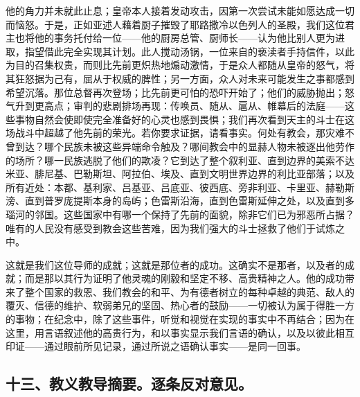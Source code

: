 他的角力并未就此止息；皇帝本人接着发动攻击，因第一次尝试未能如愿达成一切而恼怒。于是，正如亚述人藉着厨子摧毁了耶路撒冷以色列人的圣殿，我们这位君主也将他的事务托付给一位——他的厨房总管、厨师长——认为他比别人更为进取，指望借此完全实现其计划。此人搅动汤锅，一位来自的亵渎者手持信件，以此为目的召集权贵，而则比先前更炽热地煽动激情，于是众人都随从皇帝的怒气，将其狂怒据为己有，屈从于权威的脾性；另一方面，众人对未来可能发生之事都感到希望沉落。那位总督再次登场；比先前更可怕的恐吓开始了；他们的威胁抛出；怒气升到更高点；审判的悲剧排场再现：传唤员、随从、扈从、帷幕后的法庭——这些事物自然会使即使完全准备好的心灵也感到畏惧；我们再次看到天主的斗士在这场战斗中超越了他先前的荣光。若你要求证据，请看事实。何处有教会，那灾难不曾到达？哪个民族未被这些异端命令触及？哪间教会中的显赫人物未被逐出他劳作的场所？哪一民族逃脱了他们的欺凌？它到达了整个叙利亚、直到边界的美索不达米亚、腓尼基、巴勒斯坦、阿拉伯、埃及、直到文明世界边界的利比亚部落；以及所有近处：本都、基利家、吕基亚、吕底亚、彼西底、旁非利亚、卡里亚、赫勒斯滂、直到普罗庞提斯本身的岛屿；色雷斯沿海，直到色雷斯延伸之处，以及直到多瑙河的邻国。这些国家中有哪一个保持了先前的面貌，除非它们已为邪恶所占据？唯有的人民没有感受到教会这些苦难，因为我们强大的斗士拯救了他们于试炼之中。\par

这就是我们这位导师的成就；这就是那位者的成功。这确实不是那者，以及者的成就；而是那以其行为证明了他灵魂的刚毅和坚定不移、高贵精神之人。他的成功带来了整个国家的救恩、我们教会的和平、为有德者树立的每种卓越的典范、敌人的覆灭、信德的维护、软弱弟兄的坚固、热心者的鼓励——一切被认为属于得胜一方的事物；在纪念中，除了这些事件，听觉和视觉在实现的事实中不再结合；因为在这里，用言语叙述他的高贵行为，和以事实显示我们言语的确认，以及以彼此相互印证——通过眼前所见记录，通过所说之语确认事实——是同一回事。\par


\subsection{十三、教义教导摘要。逐条反对意见。}

